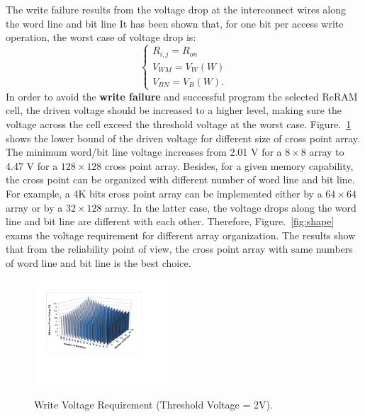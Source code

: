 The write failure results from the voltage drop at the interconnect wires
along the word line and bit line It has been shown that, for one bit per
access write operation, the worst case of voltage drop is:
\begin{equation}
\left\{
\begin{array}{l}
R_{i,j}=R_{on}\\
V_{WM}=V_W(W)\\
V_{BN}=V_B(W).
\end{array} \right.
\end{equation}
In order to avoid the \textbf{write failure} and successful program the
selected ReRAM cell, the driven voltage should be increased to a higher
level, making sure the voltage across the cell exceed the threshold
voltage at the worst case. Figure.~\ref{fig:worst_v} shows the lower bound
of the driven voltage for different size of cross point array. The minimum
word/bit line voltage increases from 2.01 V for a $8 \times 8$ array to
4.47 V for a $128 \times 128$ cross point array. Besides, for a given
memory capability, the cross point can be organized with different number
of word line and bit line. For example, a 4K bits cross point array can be
implemented either by a $64 \times 64$ array or by a $32 \times 128$
array. In the latter case, the voltage drops along the word line and bit
line are different with each other. Therefore, Figure.~\ref{fig:shape}
exams the voltage requirement for different array organization. The
results show that from the reliability point of view, the cross point
array with same numbers of word line and bit line is the best choice.


\begin{figure}%
\centering
  \includegraphics[width=0.45\textwidth]{./figures/worst_v2.pdf}\\
  \caption{Write Voltage Requirement (Threshold Voltage = 2V). }\label{fig:worst_v}
\end{figure}


